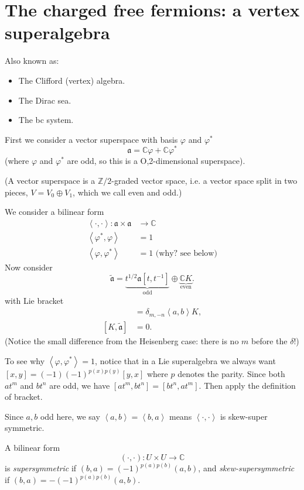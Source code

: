 \section{The charged free fermions: a vertex superalgebra}
\label{section-charges-free-fermions}

Also known as:
\begin{itemize}
\item The Clifford (vertex) algebra.
\item The Dirac sea.
\item The bc system.
\end{itemize}

First we consider a vector
superspace with basis $\varphi$ and $\varphi^*$
$$
\mathfrak{a}=\mathbb{C}\varphi +\mathbb{C} \varphi^*
$$
(where $\varphi$ and $\varphi^*$ are odd,
so this is a O,2-dimensional superspace).

(A vector superspace is a $\mathbb{Z}/2$-graded vector space,
i.e. a vector space split in two pieces,
$V=V_0\oplus V_1$, which we call even and odd.)

We consider a bilinear form
\begin{align*}
\left<\cdot,\cdot\right>: \mathfrak{a}\times \mathfrak{a}
&\longrightarrow  \mathbb{C}\\
\left<\varphi^*,\varphi\right> &=1\\
\left<\varphi,\varphi^*\right>&=1\text{ (why? see below)}
\end{align*}
Now consider
$$
\tilde{\mathfrak{a}}=\underbrace{t^{1/2}\mathfrak{a}[t,t^{-1}]}_{\text{odd}}
\oplus \underbrace{\mathbb{C}K}_{\text{even}}.
$$
with Lie bracket
\begin{align*}
[at^m,b^n]&=\delta_{m,-n}\left<a,b\right>K,\\
[K,\tilde{\mathfrak{a}}]&=0.
\end{align*}
(Notice the small difference from the
Heisenberg case: there is no $m$ before the  $\delta$!)

To see why $\left<\varphi,\varphi^*\right>=1$,
notice that in a Lie superalgebra we always want
$[x,y]=(-1)(-1)^{p(x)p(y)}[y,x]$ 
where $p$ denotes the parity.
Since both  $at^m$ and $bt^n$ are odd,
we have $[at^m,bt^n]=[bt^n,at^m]$.
Then apply the definition of bracket.

Since $a,b$ odd here,
we say $\left<a,b\right>=\left<b,a\right>$ means
$\left<\cdot,\cdot\right>$ is skew-super symmetric.

\begin{definition}
\label{definition-supersymmetric}
A bilinear form
$$
(\cdot,\cdot):U \times U \to \mathbb{C}
$$
is
{\it supersymmetric} if  $(b,a)=(-1)^{p(a)p(b)}(a,b)$,
and {\it skew-supersymmetric} if
 $(b,a)=-(-1)^{p(a)p(b)}(a,b)$.
\end{definition}

